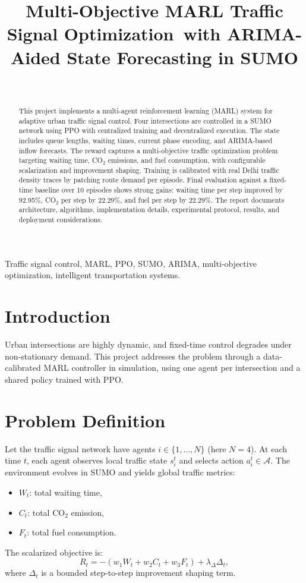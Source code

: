 \documentclass[conference]{IEEEtran}
\title{Multi-Objective MARL Traffic Signal Optimization\
with ARIMA-Aided State Forecasting in SUMO}
\author{\IEEEauthorblockN{Student Name}\
\IEEEauthorblockA{Department of Computer Science\\
College Name\\
Email: student@example.com}}
\begin{document}
\maketitle

\begin{abstract}
This project implements a multi-agent reinforcement learning (MARL) system for adaptive urban traffic signal control. Four intersections are controlled in a SUMO network using PPO with centralized training and decentralized execution. The state includes queue lengths, waiting times, current phase encoding, and ARIMA-based inflow forecasts. The reward captures a multi-objective traffic optimization problem targeting waiting time, CO$_2$ emissions, and fuel consumption, with configurable scalarization and improvement shaping. Training is calibrated with real Delhi traffic density traces by patching route demand per episode. Final evaluation against a fixed-time baseline over 10 episodes shows strong gains: waiting time per step improved by 92.95\%, CO$_2$ per step by 22.29\%, and fuel per step by 22.29\%. The report documents architecture, algorithms, implementation details, experimental protocol, results, and deployment considerations.
\end{abstract}

\begin{IEEEkeywords}
Traffic signal control, MARL, PPO, SUMO, ARIMA, multi-objective optimization, intelligent transportation systems.
\end{IEEEkeywords}

\section{Introduction}
Urban intersections are highly dynamic, and fixed-time control degrades under non-stationary demand. This project addresses the problem through a data-calibrated MARL controller in simulation, using one agent per intersection and a shared policy trained with PPO.

\section{Problem Definition}
Let the traffic signal network have agents $i \in \{1,\dots,N\}$ (here $N=4$). At each time $t$, each agent observes local traffic state $s_i^t$ and selects action $a_i^t \in \mathcal{A}$. The environment evolves in SUMO and yields global traffic metrics:
\begin{itemize}
    \item $W_t$: total waiting time,
    \item $C_t$: total CO$_2$ emission,
    \item $F_t$: total fuel consumption.
\end{itemize}
The scalarized objective is:
\begin{equation}
R_t = -\left(w_1 W_t + w_2 C_t + w_3 F_t\right) + \lambda_\Delta \Delta_t,
\end{equation}
where $\Delta_t$ is a bounded step-to-step improvement shaping term.
\end{document}
